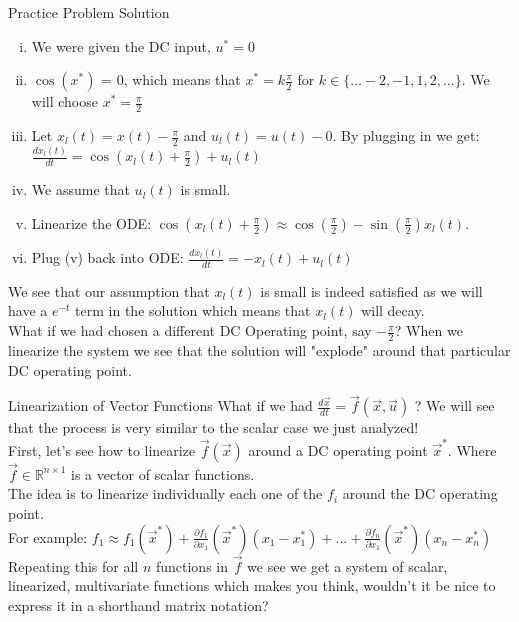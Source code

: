 \begin{frame}{Practice Problem Solution}
\begin{enumerate}[(i)]
\item We were given the DC input, $u^* = 0$ \pause \\
\item $\cos(x^*)$ = 0, which means that $x^* = k\frac{\pi}{2}$ for $k \in \{...-2,-1,1,2,...\}$. We will choose $x^* = \frac{\pi}{2}$ \pause \\
\item Let $x_l(t) = x(t) - \frac{\pi}{2}$ and $u_l(t) = u(t) - 0$.
By plugging in we get: $\frac{dx_l(t)}{dt} = \cos(x_l(t) + \frac{\pi}{2}) + u_l(t)$ \pause \\
\item We assume that $u_l(t)$ is small.\pause \\
\item Linearize the ODE: $\cos(x_l(t) + \frac{\pi}{2}) \approx \cos(\frac{\pi}{2}) -\sin(\frac{\pi}{2})x_l(t)$. \pause
\item Plug (v) back into ODE: 
$\frac{dx_l(t)}{dt} = -x_l(t) + u_l(t)$ 
\end{enumerate}
\pause 
We see that our assumption that  $x_l(t)$ is small is indeed satisfied as we will have a $e^{-t}$ term in the solution which means that $x_l(t)$ will decay.\\ \pause
What if we had chosen a different DC Operating point, say $-\frac{\pi}{2}$? When we linearize the system we see that the solution will "explode" around that particular DC operating point.
\end{frame}

\begin{frame}{Linearization of Vector Functions}
What if we had $\frac{d\vec{x}}{dt} = \vec{f}(\vec{x}, \vec{u})$ ? We will see that the process is very similar to the scalar case we just analyzed!\\ \pause
First, let's see how to linearize $\vec{f}(\vec{x})$ around a DC operating point $\vec{x}^*$. Where $\vec{f} \in \mathbb R^{n \times 1}$ is a vector of scalar functions. \\\pause
The idea is to linearize individually each one of the $f_i$ around the DC operating point. \\\pause
For example: $f_1 \approx f_1(\vec{x}^*) + \frac{\partial f_1}{\partial x_1}(\vec{x}^*)(x_1 - x_1^*) + ... +  \frac{\partial f_n}{\partial x_1}(\vec{x}^*)(x_n - x_n^*)$\\\pause
Repeating this for all $n$ functions in $\vec{f}$ we see we get a system of scalar, linearized, multivariate functions which makes you think, wouldn't it be nice to express it in a shorthand matrix notation?
\end{frame}

